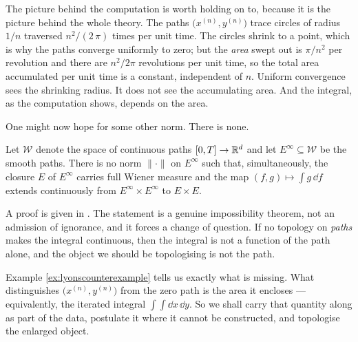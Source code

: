 The picture behind the computation is worth holding on to, because it is the picture behind the
whole theory. The paths $\bigl(x^{(n)},y^{(n)}\bigr)$ trace circles of radius $1/n$ traversed $n^2/\left(2 \, \pi\right)$
times per unit time. The circles shrink to a point, which is why the paths converge uniformly to
zero; but the \emph{area} swept out is $\pi/n^2$ per revolution and there are $n^2/2\pi$
revolutions per unit time, so the total area accumulated per unit time is a constant, independent
of $n$. Uniform convergence sees the shrinking radius. It does not see the accumulating area. And
the integral, as the computation shows, depends on the area.

One might now hope for some other norm. There is none.

\begin{proposition}[Lyons]\label{prop:nonorm}
Let $\mathcal{W}$ denote the space of continuous paths $[0,T]\to\mathbb{R}^d$ and let
$E^\infty \subseteq \mathcal{W}$ be the smooth paths. There is no norm $\lVert\cdot\rVert$ on
$E^\infty$ such that, simultaneously, the closure $E$ of $E^\infty$ carries full Wiener measure and
the map $(f,g)\mapsto\int g\,\dd f$ extends continuously from $E^\infty\times E^\infty$ to
$E\times E$. \qedopentext
\end{proposition}

A proof is given in \cite[Ch.\ 1]{frizhairer2020}. The statement is a genuine impossibility
theorem, not an admission of ignorance, and it forces a change of question. If no topology on
\emph{paths} makes the integral continuous, then the integral is not a function of the path alone,
and the object we should be topologising is not the path.

Example \ref{ex:lyonscounterexample} tells us exactly what is missing. What distinguishes
$\bigl(x^{(n)},y^{(n)}\bigr)$ from the zero path is the area it encloses --- equivalently, the
iterated integral $\int\!\!\int \dd x\,\dd y$. So we shall carry that quantity along as part of the
data, postulate it where it cannot be constructed, and topologise the enlarged object. 




